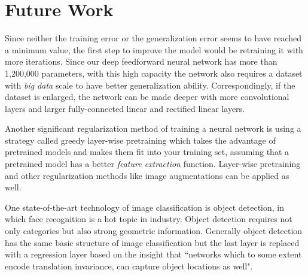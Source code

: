 \section{Future Work}
Since neither the training error or the generalization error seems to have reached a minimum value, the first step to improve the model would be retraining it with more iterations. Since our deep feedforward neural network has more than 1,200,000 parameters, with this high capacity the network also requires a dataset with \emph{big data} scale to have better generalization ability. Correspondingly, if the dataset is enlarged, the network can be made deeper with more convolutional layers and larger fully-connected linear and rectified linear layers.

Another significant regularization method of training a neural network is using a strategy called greedy layer-wise pretraining\cite{hinton2007recognize} which takes the advantage of pretrained models and makes them fit into your training set, assuming that a pretrained model has a better \emph{feature extraction} function. Layer-wise pretraining and other regularization methods like image augmentations can be applied as well.

One state-of-the-art technology of image classification is object detection\cite{krizhevsky2012imagenet}, in which face recognition\cite{taigman2014deepface} is a hot topic in industry. Object detection requires not only categories but also strong geometric information. Generally object detection has the same basic structure of image classification but the last layer is replaced with a regression layer based on the insight that ``networks which to some extent encode translation invariance, can capture object locations as well"\cite{szegedy2013deep}.
